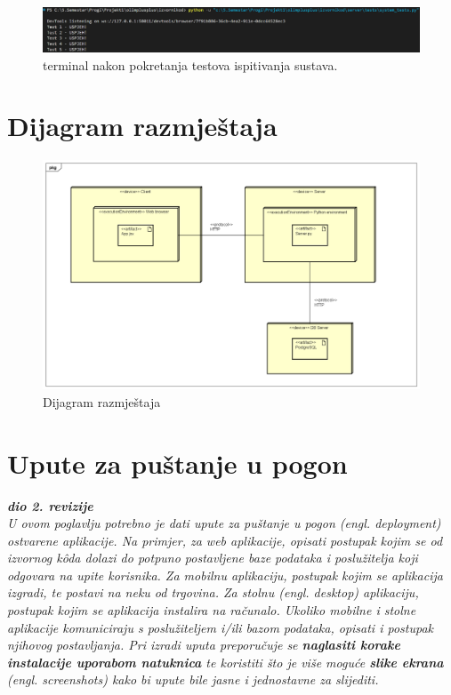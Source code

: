 \begin{figure}[htp]
    \caption{terminal nakon pokretanja testova ispitivanja sustava.}
    \includegraphics[scale=0.4]{dijagrami/terminal_screen.png}
    \centering
    
\end{figure}
\eject

		
		\section{Dijagram razmještaja}
			
		\begin{figure}[htp]
			\includegraphics[scale=0.4]{dijagrami/DeploymentDiagram0.png}
			\centering
			\caption{Dijagram razmještaja}
		\end{figure}
		
		\section{Upute za puštanje u pogon}
		
			\textbf{\textit{dio 2. revizije}}\\
		
			 \textit{U ovom poglavlju potrebno je dati upute za puštanje u pogon (engl. deployment) ostvarene aplikacije. Na primjer, za web aplikacije, opisati postupak kojim se od izvornog kôda dolazi do potpuno postavljene baze podataka i poslužitelja koji odgovara na upite korisnika. Za mobilnu aplikaciju, postupak kojim se aplikacija izgradi, te postavi na neku od trgovina. Za stolnu (engl. desktop) aplikaciju, postupak kojim se aplikacija instalira na računalo. Ukoliko mobilne i stolne aplikacije komuniciraju s poslužiteljem i/ili bazom podataka, opisati i postupak njihovog postavljanja. Pri izradi uputa preporučuje se \textbf{naglasiti korake instalacije uporabom natuknica} te koristiti što je više moguće \textbf{slike ekrana} (engl. screenshots) kako bi upute bile jasne i jednostavne za slijediti.}
			
